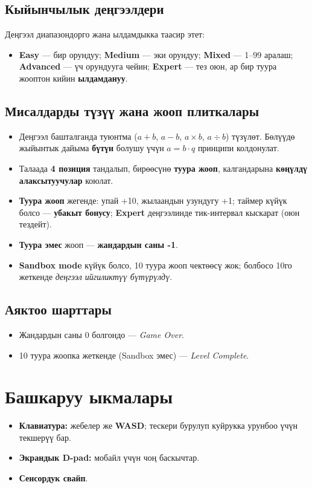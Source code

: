 \documentclass[12pt]{article}
\begin{document}
\subsection{Кыйынчылык деңгээлдери}
Деңгээл диапазондорго жана ылдамдыкка таасир этет:
\begin{itemize}
  \item \textbf{Easy} — бир орундуу; \textbf{Medium} — эки орундуу; \textbf{Mixed} — 1–99 аралаш; \textbf{Advanced} — үч орундууга чейин; \textbf{Expert} — тез оюн, ар бир туура жооптон кийин \textbf{ылдамдануу}.
\end{itemize}

\subsection{Мисалдарды түзүү жана жооп плиткалары}
\begin{itemize}
  \item Деңгээл башталганда туюнтма (\(a{+}b\), \(a{-}b\), \(a{\times}b\), \(a{\div}b\)) түзүлөт. Бөлүүдө жыйынтык дайыма \textbf{бүтүн} болушу үчүн \(a = b \cdot q\) принципи колдонулат.
  \item Талаада \textbf{4 позиция} тандалып, бирөөсүнө \textbf{туура жооп}, калгандарына \textbf{көңүлдү алаксытуучулар} коюлат.
  \item \textbf{Туура жооп} жегенде: упай +10, жылаандын узундугу +1; таймер күйүк болсо — \textbf{убакыт бонусу}; \textbf{Expert} деңгээлинде тик-интервал кыскарат (оюн тездейт).
  \item \textbf{Туура эмес} жооп — \textbf{жандардын саны -1}.
  \item \textbf{Sandbox mode} күйүк болсо, 10 туура жооп чектөөсү жок; болбосо 10го жеткенде \textit{деңгээл ийгиликтүү бүтүрүлдү}.
\end{itemize}

\subsection{Аяктоо шарттары}
\begin{itemize}
  \item Жандардын саны 0 болгондо — \textit{Game Over}.
  \item 10 туура жоопка жеткенде (Sandbox эмес) — \textit{Level Complete}.
\end{itemize}

\section{Башкаруу ыкмалары}
\begin{itemize}
  \item \textbf{Клавиатура:} жебелер же \textbf{WASD}; тескери бурулуп куйрукка урунбоо үчүн текшерүү бар.
  \item \textbf{Экрандык D-pad:} мобайл үчүн чоң баскычтар.
  \item \textbf{Сенсордук свайп}.
\end{itemize}
\end{document}
